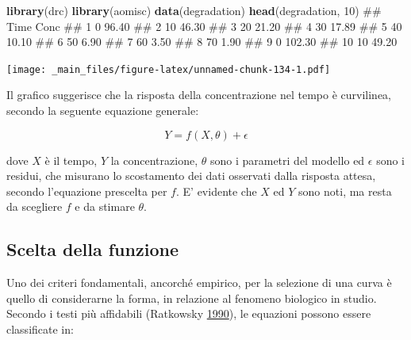 \documentclass[a4paper,12pt,oneside]{book}
\newenvironment{Shaded}{\begin{snugshade}}{\end{snugshade}}
\newcommand{\KeywordTok}[1]{\textcolor[rgb]{0.13,0.29,0.53}{\textbf{#1}}}
\newcommand{\DecValTok}[1]{\textcolor[rgb]{0.00,0.00,0.81}{#1}}
\newcommand{\NormalTok}[1]{#1}
\theoremstyle{definition}
\theoremstyle{definition}
\theoremstyle{definition}
\theoremstyle{remark}
\begin{document}
\begin{Shaded}
\begin{Highlighting}[]
\KeywordTok{library}\NormalTok{(drc)}
\KeywordTok{library}\NormalTok{(aomisc)}
\KeywordTok{data}\NormalTok{(degradation)}
\KeywordTok{head}\NormalTok{(degradation, }\DecValTok{10}\NormalTok{)}
\NormalTok{##    Time   Conc}
\NormalTok{## 1     0  96.40}
\NormalTok{## 2    10  46.30}
\NormalTok{## 3    20  21.20}
\NormalTok{## 4    30  17.89}
\NormalTok{## 5    40  10.10}
\NormalTok{## 6    50   6.90}
\NormalTok{## 7    60   3.50}
\NormalTok{## 8    70   1.90}
\NormalTok{## 9     0 102.30}
\NormalTok{## 10   10  49.20}
\end{Highlighting}
\end{Shaded}

\texttt{[image: \_main\_files/figure-latex/unnamed-chunk-134-1.pdf]}

Il grafico suggerisce che la risposta della concentrazione nel tempo è
curvilinea, secondo la seguente equazione generale:

\[ Y = f(X, \theta) + \epsilon \]

dove \(X\) è il tempo, \(Y\) la concentrazione, \(\theta\) sono i
parametri del modello ed \(\epsilon\) sono i residui, che misurano lo
scostamento dei dati osservati dalla risposta attesa, secondo
l'equazione prescelta per \(f\). E' evidente che \(X\) ed \(Y\) sono
noti, ma resta da scegliere \(f\) e da stimare \(\theta\).

\subsection{Scelta della funzione}\label{scelta-della-funzione}

Uno dei criteri fondamentali, ancorché empirico, per la selezione di una
curva è quello di considerarne la forma, in relazione al fenomeno
biologico in studio. Secondo i testi più affidabili (Ratkowsky
\protect\hyperlink{ref-ratko1990Handbook}{1990}), le equazioni possono
essere classificate in:
\end{document}
